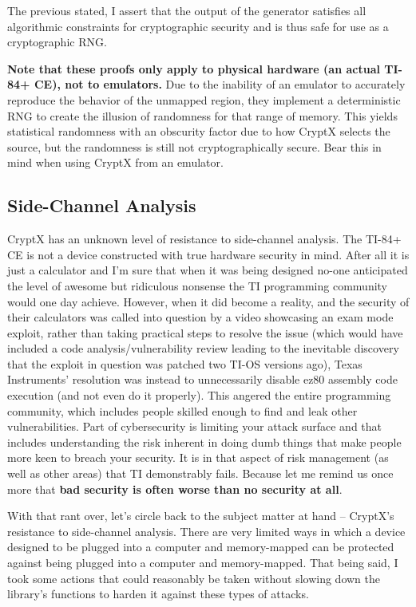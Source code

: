 \documentclass[titlepage]{report}
\newcommand{\critical}[1]{{\color{danger}\textbf{#1}}}
\begin{document}
	The previous stated, I assert that the output of the generator satisfies all algorithmic constraints for cryptographic security and is thus safe for use as a cryptographic RNG.
	
	\critical{Note that these proofs only apply to physical hardware (an actual TI-84+ CE), not to emulators.} Due to the inability of an emulator to accurately reproduce the behavior of the unmapped region, they implement a deterministic RNG to create the illusion of randomness for that range of memory. This yields statistical randomness with an obscurity factor due to how CryptX selects the source, but the randomness is still not cryptographically secure. Bear this in mind when using CryptX from an emulator.
	
	\subsection{Side-Channel Analysis}
	CryptX has an unknown level of resistance to side-channel analysis. The TI-84+ CE is not a device constructed with true hardware security in mind. After all it is just a calculator and I'm sure that when it was being designed no-one anticipated the level of awesome but ridiculous nonsense the TI programming community would one day achieve. However, when it did become a reality, and the security of their calculators was called into question by a video showcasing an exam mode exploit, rather than taking practical steps to resolve the issue (which would have included a code analysis/vulnerability review leading to the inevitable discovery that the exploit in question was patched two TI-OS versions ago), Texas Instruments' resolution was instead to unnecessarily disable ez80 assembly code execution (and not even do it properly). This angered the entire programming community, which includes people skilled enough to find and leak other vulnerabilities. Part of cybersecurity is limiting your attack surface and that includes understanding the risk inherent in doing dumb things that make people more keen to breach your security. It is in that aspect of risk management (as well as other areas) that TI demonstrably fails. Because let me remind us once more that \critical{bad security is often worse than no security at all}.
	
	With that rant over, let's circle back to the subject matter at hand -- CryptX's resistance to side-channel analysis. There are very limited ways in which a device designed to be plugged into a computer and memory-mapped can be protected against being plugged into a computer and memory-mapped. That being said, I took some actions that could reasonably be taken without slowing down the library's functions to harden it against these types of attacks.
	
\end{document}
